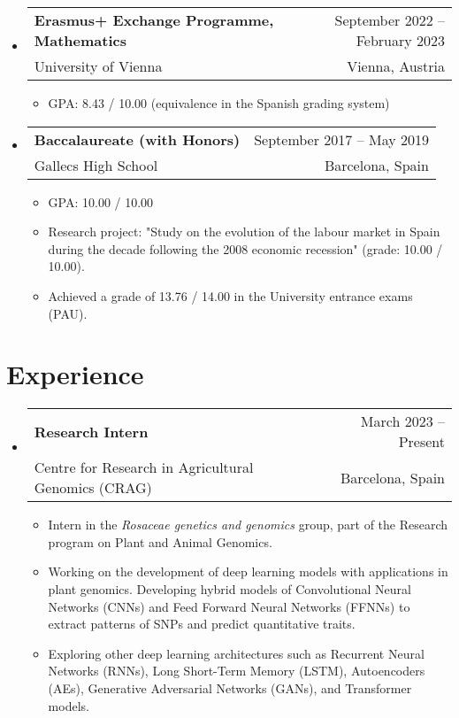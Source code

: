 \documentclass[a4paper,11pt]{article}
\makeatletter
\newcommand{\resumeQuadHeading}[4]{
  \item
  \begin{tabular*}{0.96\textwidth}[t]{l@{\extracolsep{\fill}}r}
    \textbf{#1} & \small #2 \\
    \small#3 & \small #4 \\
  \end{tabular*}
}
\newcommand{\resumeHeadingListStart}{
  \begin{itemize}[leftmargin=0.15in, label={}]
}
\newcommand{\resumeHeadingListEnd}{\end{itemize}}
\makeatother
\begin{document}
  \resumeHeadingListStart{}
    \resumeQuadHeading{Erasmus+ Exchange Programme, Mathematics}{September 2022 – February 2023}
    {University of Vienna}{Vienna, Austria}
    \begin{itemize}[leftmargin=3em, itemsep=0.1em, topsep=2pt]
        \item \small GPA: 8.43 / 10.00 (equivalence in the Spanish grading system)
    \end{itemize}
  \resumeHeadingListEnd{}
  
  \resumeHeadingListStart{}
    \resumeQuadHeading{Baccalaureate (with Honors)}{September 2017 – May 2019}
    {Gallecs High School}{Barcelona, Spain}
    \begin{itemize}[leftmargin=3em, itemsep=0.1em, topsep=2pt]
      \item \small GPA: 10.00 / 10.00
      \item \small Research project: "Study on the evolution of the labour market in Spain during the decade following the 2008 economic recession" (grade: 10.00 / 10.00).
      \item \small Achieved a grade of 13.76 / 14.00 in the University entrance exams (PAU).
    \end{itemize}
  \resumeHeadingListEnd{}


\section{Experience}
  \resumeHeadingListStart{}
    \resumeQuadHeading{Research Intern}{March 2023 – Present}
    {Centre for Research in Agricultural Genomics (CRAG)}{Barcelona, Spain}
    \begin{itemize}[leftmargin=3em, itemsep=0.1em, topsep=2pt]
      \item \small Intern in the \textit{Rosaceae genetics and genomics} group, part of the Research program on Plant and Animal Genomics.
      \item \small Working on the development of deep learning models with applications in plant genomics. Developing hybrid models of Convolutional Neural Networks (CNNs) and Feed Forward Neural Networks (FFNNs) to extract patterns of SNPs and predict quantitative traits.
      \item \small Exploring other deep learning architectures such as Recurrent Neural Networks (RNNs), Long Short-Term Memory (LSTM), Autoencoders (AEs), Generative Adversarial Networks (GANs), and Transformer models.
    \end{itemize}
  \resumeHeadingListEnd{}
\end{document}
